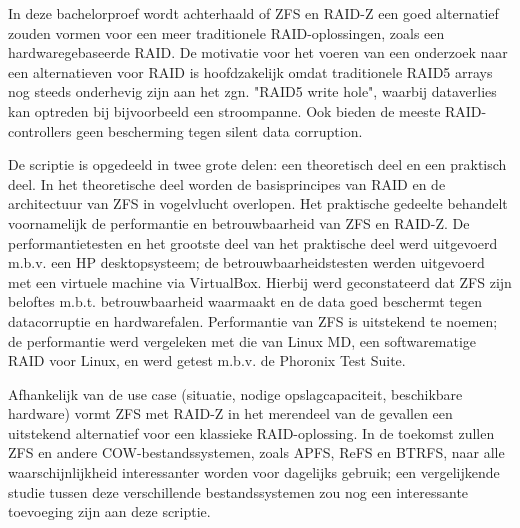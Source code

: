In deze bachelorproef wordt achterhaald of ZFS en RAID-Z een goed alternatief zouden vormen voor een meer traditionele RAID-oplossingen, zoals een hardwaregebaseerde RAID. De motivatie voor het voeren van een onderzoek naar een alternatieven voor RAID is hoofdzakelijk omdat traditionele RAID5 arrays nog steeds onderhevig zijn aan het zgn. "RAID5 write hole", waarbij dataverlies kan optreden bij bijvoorbeeld een stroompanne. Ook bieden de meeste RAID-controllers geen bescherming tegen silent data corruption.

De scriptie is opgedeeld in twee grote delen: een theoretisch deel en een praktisch deel. In het theoretische deel worden de basisprincipes van RAID en de architectuur van ZFS in vogelvlucht overlopen. Het praktische gedeelte behandelt voornamelijk de performantie en betrouwbaarheid van ZFS en RAID-Z. 
De performantietesten en het grootste deel van het praktische deel werd uitgevoerd m.b.v. een HP desktopsysteem; de betrouwbaarheidstesten werden uitgevoerd met een virtuele machine via VirtualBox. Hierbij werd geconstateerd dat ZFS zijn beloftes m.b.t. betrouwbaarheid waarmaakt en de data goed beschermt tegen datacorruptie en hardwarefalen. Performantie van ZFS is uitstekend te noemen; de performantie werd vergeleken met die van Linux MD, een softwarematige RAID voor Linux, en werd getest m.b.v. de Phoronix Test Suite.

Afhankelijk van de use case (situatie, nodige opslagcapaciteit, beschikbare hardware) vormt ZFS met RAID-Z in het merendeel van de gevallen een uitstekend alternatief voor een klassieke RAID-oplossing. In de toekomst zullen ZFS en andere COW-bestandssystemen, zoals APFS, ReFS en BTRFS, naar alle waarschijnlijkheid interessanter worden voor dagelijks gebruik; een vergelijkende studie tussen deze verschillende bestandssystemen zou nog een interessante toevoeging zijn aan deze scriptie.
